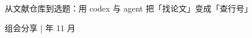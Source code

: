 \documentclass[xcolor=table,dvipsnames,svgnames,aspectratio=169]{ctexbeamer}
\let\\\relax
\begin{document}

\begin{frame}
  \vfill
  \centering
  {\large 从文献仓库到选题：\\[0.2em]
   用 codex 与 agent 把「找论文」变成「查行号」\par}
  \vfill
  组会分享 \;| 年 11 月\par
  \vfill
\end{frame}



\makebottom
\end{document}
